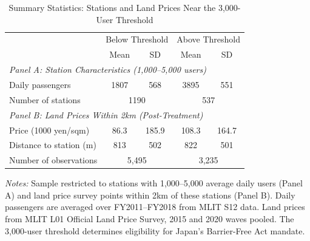 \begin{table}[t]
\centering
\caption{Summary Statistics: Stations and Land Prices Near the 3,000-User Threshold}
\label{tab:summary}
\begin{tabular}{lcccc}
\hline\hline
 & \multicolumn{2}{c}{Below Threshold} & \multicolumn{2}{c}{Above Threshold} \\
 & Mean & SD & Mean & SD \\
\hline
\multicolumn{5}{l}{\textit{Panel A: Station Characteristics (1,000--5,000 users)}} \\
Daily passengers & 1807 & 568 & 3895 & 551 \\
Number of stations & \multicolumn{2}{c}{1190} & \multicolumn{2}{c}{537} \\
[6pt]
\multicolumn{5}{l}{\textit{Panel B: Land Prices Within 2km (Post-Treatment)}} \\
Price (1000 yen/sqm) & 86.3 & 185.9 & 108.3 & 164.7 \\
Distance to station (m) & 813 & 502 & 822 & 501 \\
Number of observations & \multicolumn{2}{c}{5,495} & \multicolumn{2}{c}{3,235} \\
\hline\hline
\end{tabular}
\begin{tablenotes}
\item \textit{Notes:} Sample restricted to stations with 1,000--5,000 average daily users (Panel A) and land price survey points within 2km of these stations (Panel B). Daily passengers are averaged over FY2011--FY2018 from MLIT S12 data. Land prices from MLIT L01 Official Land Price Survey, 2015 and 2020 waves pooled. The 3,000-user threshold determines eligibility for Japan's Barrier-Free Act mandate.
\end{tablenotes}
\end{table}

